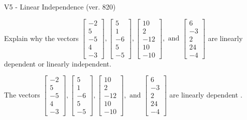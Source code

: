 \begin{exercise}
  \begin{exerciseTitle}V5 - Linear Independence (ver. 820)\end{exerciseTitle}
  \begin{exerciseStatement}
    Explain why the vectors \(\left[\begin{array}{r}
-2 \\
5 \\
-5 \\
4 \\
-3
\end{array}\right] , \left[\begin{array}{r}
5 \\
1 \\
-6 \\
5 \\
-5
\end{array}\right] , \left[\begin{array}{r}
10 \\
2 \\
-12 \\
10 \\
-10
\end{array}\right] , \text{ and } \left[\begin{array}{r}
6 \\
-3 \\
2 \\
24 \\
-4
\end{array}\right]\) are linearly dependent or linearly independent.	


  \end{exerciseStatement}
  \begin{exerciseAnswer}
   The vectors \(\left[\begin{array}{r}
-2 \\
5 \\
-5 \\
4 \\
-3
\end{array}\right] , \left[\begin{array}{r}
5 \\
1 \\
-6 \\
5 \\
-5
\end{array}\right] , \left[\begin{array}{r}
10 \\
2 \\
-12 \\
10 \\
-10
\end{array}\right] , \text{ and } \left[\begin{array}{r}
6 \\
-3 \\
2 \\
24 \\
-4
\end{array}\right]\) are 
  	 linearly dependent  .
  


  \end{exerciseAnswer}
\end{exercise}